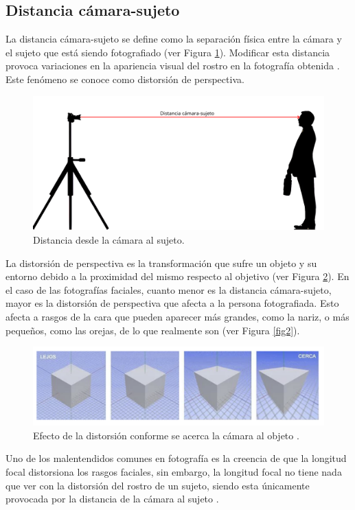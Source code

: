 \subsection*{Distancia cámara-sujeto}

La distancia cámara-sujeto se define como la separación física entre la cámara y el sujeto que está siendo fotografiado (ver Figura \ref{fig14}). Modificar esta distancia provoca variaciones en la apariencia visual del rostro en la fotografía obtenida \cite{43}. Este fenómeno se conoce como distorsión de perspectiva.

\begin{figure}[h]
	\centering
	\includegraphics[scale=0.1]{imagenes/cap2/SCD_final.png}
	\caption[Distancia desde la cámara al sujeto.]{Distancia desde la cámara al sujeto.}
	\label{fig14}
\end{figure}

La distorsión de perspectiva \cite{8,51} es la transformación que sufre un objeto y su entorno debido a la proximidad del mismo respecto al objetivo (ver Figura \ref{fig15}). En el caso de las fotografías faciales, cuanto menor es la distancia cámara-sujeto, mayor es la distorsión de perspectiva que afecta a la persona fotografiada. Esto afecta a rasgos de la cara que pueden aparecer más grandes, como la nariz, o más pequeños, como las orejas, de lo que realmente son (ver Figura \ref{fig2}).

\begin{figure}[h]
	\centering
	\includegraphics[scale=0.5]{imagenes/cap2/distorsion.png}
	\caption[Efectos de la distorsión según distancia.]{Efecto de la distorsión conforme se acerca la cámara al objeto \cite{51}.}
	\label{fig15}
\end{figure}

Uno de los malentendidos comunes en fotografía es la creencia de que la longitud focal distorsiona los rasgos faciales, sin embargo, la longitud focal no tiene nada que ver con la distorsión del rostro de un sujeto, siendo esta únicamente provocada por la distancia de la cámara al sujeto \cite{52}.



